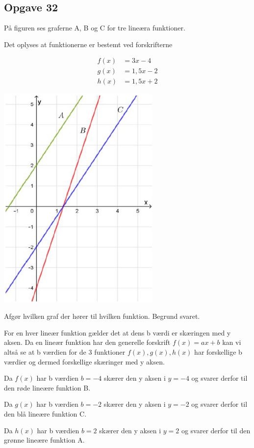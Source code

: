 \subsection{Opgave 32}

På figuren ses graferne A, B og C for tre lineæra funktioner.

Det oplyses at funktionerne er bestemt ved forskrifterne

\begin{align*}
    f(x) &= 3x - 4\\
    g(x) &= 1,5x - 2\\
    h(x) &= 1,5x + 2
\end{align*}

\includegraphics[width=8cm]{Opgave_31-40/Opgave_32/32.png}

Afgør hvilken graf der hører til hvilken funktion. Begrund svaret.

\ans

For en hver lineær funktion gælder det at dens b værdi er skæringen med y aksen.
Da en lineær funktion har den generelle forskrift $f(x) = ax + b$ kan vi altså se at b værdien for de
3 funktioner $f(x), g(x), h(x)$ har forskellige b værdier og dermed forskellige skæringer med y aksen.

Da $f(x)$ har b værdien $b = -4$ skærer den y aksen i $y = -4$ og svarer derfor til den røde lineære funktion B.

Da $g(x)$ har b værdien $b = -2$ skærer den y aksen i $y = -2$ og svarer derfor til den blå lineære funktion C.

Da $h(x)$ har b værdien $b = 2$ skærer den y aksen i $y = 2$ og svarer derfor til den grønne lineære funktion A.